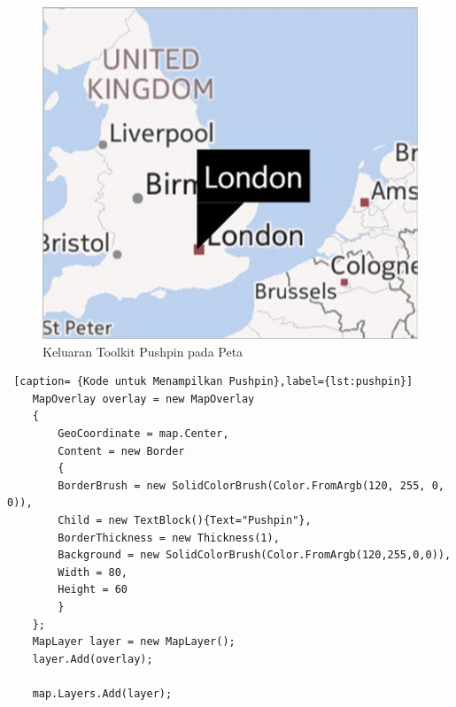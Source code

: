 \begin{figure}[h]
	\centering
		\includegraphics[scale=0.5]{Gambar/toolkit_pushpin}
	\caption{Keluaran Toolkit Pushpin pada Peta \cite{Manning}}
	\label{fig:toolkit_pushpin}
\end{figure}

\begin{lstlisting} [caption= {Kode untuk Menampilkan Pushpin},label={lst:pushpin}]
	MapOverlay overlay = new MapOverlay
	{
		GeoCoordinate = map.Center,
		Content = new Border
		{
		BorderBrush = new SolidColorBrush(Color.FromArgb(120, 255, 0, 0)),
		Child = new TextBlock(){Text="Pushpin"},
		BorderThickness = new Thickness(1),
		Background = new SolidColorBrush(Color.FromArgb(120,255,0,0)),
		Width = 80,
		Height = 60
		}
	};
	MapLayer layer = new MapLayer();
	layer.Add(overlay);

	map.Layers.Add(layer);
\end{lstlisting}

